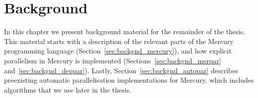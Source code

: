 
\chapter{Background}
\label{chap:backgnd}

In this chapter we present background material for the remainder of the
thesis.
This material starts with a description of the relevant parts of the Mercury
programming language (Section~\ref{sec:backgnd_mercury}),
and how explicit parallelism in Mercury is implemented
(Sections~\ref{sec:backgnd_merpar} and~\ref{sec:backgnd_deppar}).
Lastly, Section~\ref{sec:backgnd_autopar} describes preexisting automatic
parallelisation implementations for Mercury,
which includes algorithms that we use later in the thesis.









